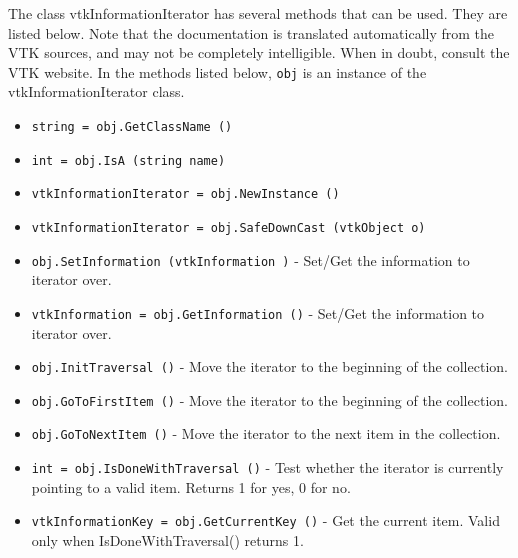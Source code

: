 The class vtkInformationIterator has several methods that can be used.
  They are listed below.
Note that the documentation is translated automatically from the VTK sources,
and may not be completely intelligible.  When in doubt, consult the VTK website.
In the methods listed below, \verb|obj| is an instance of the vtkInformationIterator class.
\begin{itemize}
\item  \verb|string = obj.GetClassName ()|

\item  \verb|int = obj.IsA (string name)|

\item  \verb|vtkInformationIterator = obj.NewInstance ()|

\item  \verb|vtkInformationIterator = obj.SafeDownCast (vtkObject o)|

\item  \verb|obj.SetInformation (vtkInformation )| -  Set/Get the information to iterator over.

\item  \verb|vtkInformation = obj.GetInformation ()| -  Set/Get the information to iterator over.

\item  \verb|obj.InitTraversal ()| -  Move the iterator to the beginning of the collection.

\item  \verb|obj.GoToFirstItem ()| -  Move the iterator to the beginning of the collection.

\item  \verb|obj.GoToNextItem ()| -  Move the iterator to the next item in the collection.

\item  \verb|int = obj.IsDoneWithTraversal ()| -  Test whether the iterator is currently pointing to a valid
 item. Returns 1 for yes, 0 for no.

\item  \verb|vtkInformationKey = obj.GetCurrentKey ()| -  Get the current item. Valid only when IsDoneWithTraversal()
 returns 1.

\end{itemize}
